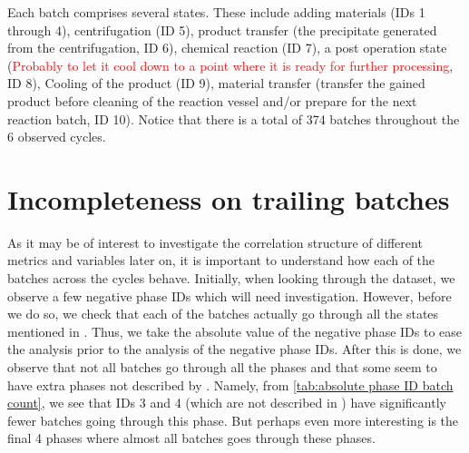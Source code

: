 \documentclass[../Thesis.tex]{subfiles}
\begin{document}
Each batch comprises several states. These include adding materials (IDs 1 through 4), centrifugation (ID 5), product transfer (the precipitate generated from the centrifugation, ID 6), chemical reaction (ID 7), a post operation state (\textcolor{red}{Probably to let it cool down to a point where it is ready for further processing}, ID 8), Cooling of the product (ID 9), material transfer (transfer the gained product before cleaning of the reaction vessel and/or prepare for the next reaction batch, ID 10). Notice that there is a total of 374 batches throughout the 6 observed cycles.



\section{Incompleteness on trailing batches}
As it may be of interest to investigate the correlation structure of different metrics and variables later on, it is important to understand how each of the batches across the cycles behave. Initially, when looking through the dataset, we observe a few negative phase IDs which will need investigation. However, before we do so, we check that each of the batches actually go through all the states mentioned in \cite{benchmark-model-to-generate-batch-process-data}. Thus, we take the absolute value of the negative phase IDs to ease the analysis prior to the analysis of the negative phase IDs. After this is done, we observe that not all batches go through all the phases and that some seem to have extra phases not described by \cite{benchmark-model-to-generate-batch-process-data}. Namely, from \autoref{tab:absolute phase ID batch count}, we see that IDs 3 and 4 (which are not described in \cite{benchmark-model-to-generate-batch-process-data}) have significantly fewer batches going through this phase. But perhaps even more interesting is the final 4 phases where almost all batches goes through these phases.
\end{document}
